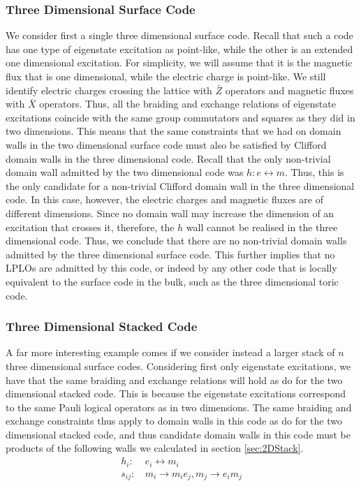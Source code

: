 \documentclass[pra,twocolumn,a4paper,nofootinbib]{revtex4-1}
\begin{document}
\subsubsection{Three Dimensional Surface Code}
We consider first a single three dimensional surface code. Recall that such a code has one type of eigenstate excitation as point-like, while the other is an extended one dimensional excitation. For simplicity, we will assume that it is the magnetic flux that is one dimensional, while the electric charge is point-like. We still identify electric charges crossing the lattice with $\bar{Z}$ operators and magnetic fluxes with $\bar{X}$ operators. Thus, all the braiding and exchange relations of eigenstate excitations coincide with the same group commutators and squares as they did in two dimensions. This means that the same constraints that we had on domain walls in the two dimensional surface code must also be satisfied by Clifford domain walls in the three dimensional code. Recall that the only non-trivial domain wall admitted by the two dimensional code was $h: e \leftrightarrow m$. Thus, this is the only candidate for a non-trivial Clifford domain wall in the three dimensional code. In this case, however, the electric charges and magnetic fluxes are of different dimensions. Since no domain wall may increase the dimension of an excitation that crosses it, therefore, the $h$ wall cannot be realised in the three dimensional code. Thus, we conclude that there are no non-trivial domain walls admitted by the three dimensional surface code. This further implies that no LPLOs are admitted by this code, or indeed by any other code that is locally equivalent to the surface code in the bulk, such as the three dimensional toric code.

\subsubsection{Three Dimensional Stacked Code}
\label{IVB2}
A far more interesting example comes if we consider instead a larger stack of $n$ three dimensional surface codes. Considering first only eigenstate excitations, we have that the same braiding and exchange relations will hold as do for the two dimensional stacked code. This is because the eigenstate excitations correspond to the same Pauli logical operators as in two dimensions. The same braiding and exchange constraints thus apply to domain walls in this code as do for the two dimensional stacked code, and thus candidate domain walls in this code must be products of the following walls we calculated in section \ref{sec:2DStack}.
\begin{align}
h_i: &\, e_i \leftrightarrow m_i\\
s_{ij}: &\, m_i \to m_ie_j, m_j \to e_i m_j
\end{align}
\end{document}

